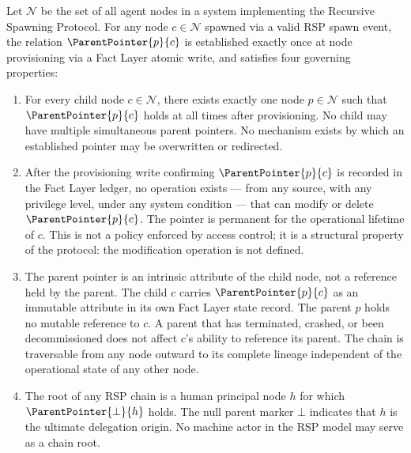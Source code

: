 \begin{definition}
\label{def:parent-pointer}
Let $\mathcal{N}$ be the set of all agent nodes in a \bxthree{} system implementing the Recursive Spawning Protocol. For any node $c \in \mathcal{N}$ spawned via a valid RSP spawn event, the relation $\ParentPointer{p}{c}$ is established exactly once at node provisioning via a Fact Layer atomic write, and satisfies four governing properties:

\begin{enumerate}
    \item[(P1) \textbf{Uniqueness}] For every child node $c \in \mathcal{N}$, there exists exactly one node $p \in \mathcal{N}$ such that $\ParentPointer{p}{c}$ holds at all times after provisioning. No child may have multiple simultaneous parent pointers. No mechanism exists by which an established pointer may be overwritten or redirected.

    \item[(P2) \textbf{Immutability}] After the provisioning write confirming $\ParentPointer{p}{c}$ is recorded in the Fact Layer ledger, no operation exists --- from any source, with any privilege level, under any system condition --- that can modify or delete $\ParentPointer{p}{c}$. The pointer is permanent for the operational lifetime of $c$. This is not a policy enforced by access control; it is a structural property of the protocol: the modification operation is not defined.

    \item[(P3) \textbf{Directionality}] The parent pointer is an intrinsic attribute of the child node, not a reference held by the parent. The child $c$ carries $\ParentPointer{p}{c}$ as an immutable attribute in its own Fact Layer state record. The parent $p$ holds no mutable reference to $c$. A parent that has terminated, crashed, or been decommissioned does not affect $c$'s ability to reference its parent. The chain is traversable from any node outward to its complete lineage independent of the operational state of any other node.

    \item[(P4) \textbf{Human Anchor Termination}] The root of any RSP chain is a human principal node $h$ for which $\ParentPointer{\bot}{h}$ holds. The null parent marker $\bot$ indicates that $h$ is the ultimate delegation origin. No machine actor in the RSP model may serve as a chain root.
\end{enumerate}
\end{definition}

